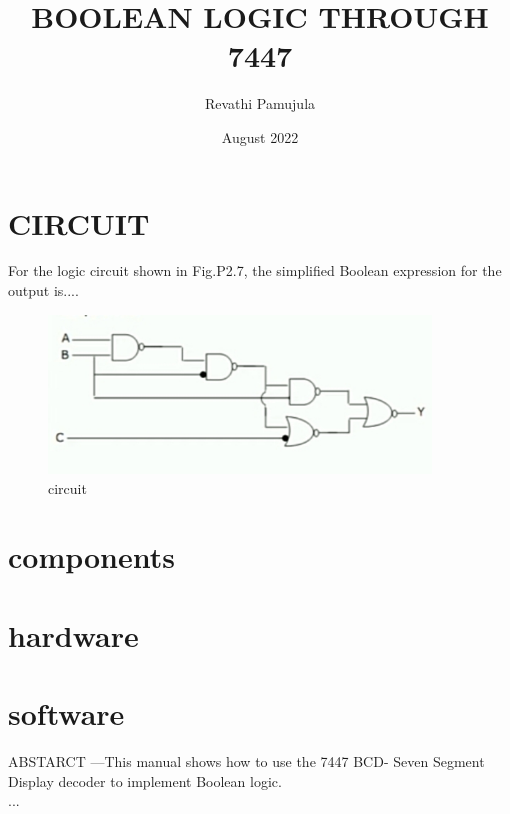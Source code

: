 \documentclass{article}
\title{BOOLEAN LOGIC THROUGH 7447}
\author{Revathi Pamujula}
\date{August 2022}
\begin{document}
\maketitle

\section{CIRCUIT}

For the logic circuit shown in Fig.P2.7, the simplified Boolean expression for the output is....\\
\begin{figure}
    \centering
    \includegraphics[width=4in]{boolean.jpg}
    \caption{circuit}
    \label{fig:circuit}
\end{figure}
\section{components}
\section{hardware}
\section{software}
ABSTARCT —This manual shows how to use the 7447 BCD-
Seven Segment Display decoder to implement Boolean logic.\\
...\\
\end{document}
